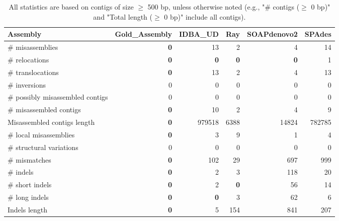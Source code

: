 \documentclass[12pt,a4paper]{article}
\begin{document}
\begin{table}[ht]
\begin{center}
\caption{All statistics are based on contigs of size $\geq$ 500 bp, unless otherwise noted (e.g., "\# contigs ($\geq$ 0 bp)" and "Total length ($\geq$ 0 bp)" include all contigs).}
\begin{tabular}{|l*{5}{|r}|}
\hline
Assembly & Gold\_Assembly & IDBA\_UD & Ray & SOAPdenovo2 & SPAdes \\ \hline
\# misassemblies & {\bf 0} & 13 & 2 & 4 & 14 \\ \hline
\hspace{5mm}\# relocations & {\bf 0} & {\bf 0} & {\bf 0} & {\bf 0} & 1 \\ \hline
\hspace{5mm}\# translocations & {\bf 0} & 13 & 2 & 4 & 13 \\ \hline
\hspace{5mm}\# inversions & 0 & 0 & 0 & 0 & 0 \\ \hline
\# possibly misassembled contigs & 0 & 0 & 0 & 0 & 0 \\ \hline
\# misassembled contigs & {\bf 0} & 10 & 2 & 4 & 9 \\ \hline
Misassembled contigs length & {\bf 0} & 979518 & 6388 & 14824 & 782785 \\ \hline
\# local misassemblies & {\bf 0} & 3 & 9 & 1 & 4 \\ \hline
\# structural variations & 0 & 0 & 0 & 0 & 0 \\ \hline
\# mismatches & {\bf 0} & 102 & 29 & 697 & 999 \\ \hline
\# indels & {\bf 0} & 2 & 3 & 118 & 20 \\ \hline
\hspace{5mm}\# short indels & {\bf 0} & 2 & {\bf 0} & 56 & 14 \\ \hline
\hspace{5mm}\# long indels & {\bf 0} & {\bf 0} & 3 & 62 & 6 \\ \hline
Indels length & {\bf 0} & 5 & 154 & 841 & 207 \\ \hline
\end{tabular}
\end{center}
\end{table}
\end{document}
